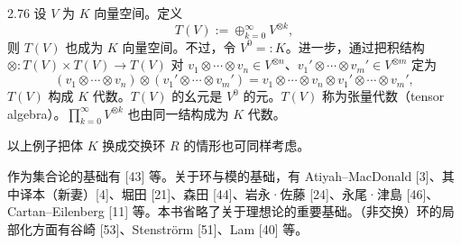 \begin{example}{2.76} 设 $V$ 为 $K$ 向量空间。定义
\[
  T(V):=\oplus_{k=0}^\infty V^{\otimes k},
\]
则 $T(V)$ 也成为 $K$ 向量空间。不过，令 $V^0=:K$。进一步，通过把积结构 $\otimes\colon T(V)\times T(V)\to T(V)$ 对 $v_1\otimes\cdots\otimes v_n\in V^{\otimes n}$、$v_1'\otimes\cdots\otimes v_m'\in V^{\otimes m}$ 定为
\[
  (v_1\otimes\cdots\otimes v_n)\otimes(v_1'\otimes\cdots\otimes v_m')=v_1\otimes\cdots\otimes v_n\otimes v_1'\otimes\cdots\otimes v_m',
\]
$T(V)$ 构成 $K$ 代数。$T(V)$ 的幺元是 $V^0$ 的元。$T(V)$ 称为张量代数（tensor algebra）。$\prod_{k=0}^\infty V^{\otimes k}$ 也由同一结构成为 $K$ 代数。\end{example}


以上例子把体 $K$ 换成交换环 $R$ 的情形也可同样考虑。

 作为集合论的基础有 [43] 等。关于环与模的基础，有 Atiyah–MacDonald [3]、其中译本（新妻）[4]、堀田 [21]、森田 [44]、岩永·佐藤 [24]、永尾·津島 [46]、Cartan–Eilenberg [11] 等。本书省略了关于理想论的重要基础。（非交换）环的局部化方面有谷崎 [53]、Stenströrm [51]、Lam [40] 等。


